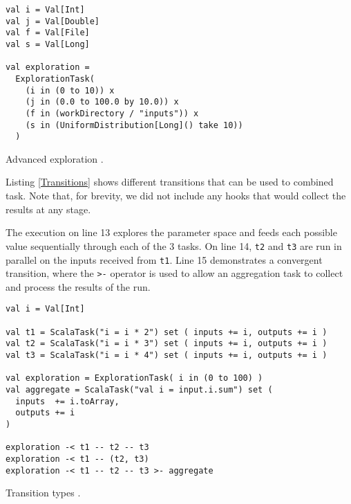 \begin{listing}[h]
	\centering
	\begin{minipage}{10.6cm}
		\begin{verbatim}
val i = Val[Int]
val j = Val[Double]
val f = Val[File]
val s = Val[Long]

val exploration = 
  ExplorationTask(
	(i in (0 to 10)) x 
	(j in (0.0 to 100.0 by 10.0)) x
	(f in (workDirectory / "inputs")) x 
	(s in (UniformDistribution[Long]() take 10))
  )
		\end{verbatim}
	\end{minipage}
	\caption{Advanced exploration \cite{Leclaire2016}.}
	\label{Sampling}
\end{listing}

Listing \ref{Transitions} shows different transitions that can be used to combined task. Note that, for brevity, we did not include any hooks that would collect the results at any stage. 

The execution on line 13 explores the parameter space and feeds each possible value sequentially through each of the 3 tasks. On line 14, \verb|t2| and \verb|t3| are run in parallel on the inputs received from \verb|t1|. Line 15 demonstrates a convergent transition, where the \verb|>-| operator is used to allow an aggregation task to collect and process the results of the run.

\begin{listing}[h]
	\centering
	\begin{minipage}{12.4cm}
		\begin{verbatim}
val i = Val[Int]

val t1 = ScalaTask("i = i * 2") set ( inputs += i, outputs += i )
val t2 = ScalaTask("i = i * 3") set ( inputs += i, outputs += i )
val t3 = ScalaTask("i = i * 4") set ( inputs += i, outputs += i )

val exploration = ExplorationTask( i in (0 to 100) )
val aggregate = ScalaTask("val i = input.i.sum") set (
  inputs  += i.toArray,
  outputs += i
)

exploration -< t1 -- t2 -- t3
exploration -< t1 -- (t2, t3)
exploration -< t1 -- t2 -- t3 >- aggregate
		\end{verbatim}
	\end{minipage}
	\caption{Transition types \cite{OpenMOLEDSL}.}
	\label{Transitions}
\end{listing}

